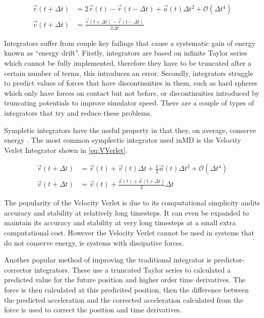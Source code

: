 \documentclass[12pt]{UoAthesis}
\begin{document}
\begin{subequations} \begin{align} \vec{r}(t + \Delta t) &= 2\vec{r}(t) -
\vec{r}(t - \Delta t) + \vec{a}(t)\Delta t^2 + \mathcal{O}(\Delta t^4)
\label{eq:Verletpos} \\ \vec{v}(t+\Delta t) &= \frac{\vec{r}(t+\Delta t) -
\vec{r}(t-\Delta t)}{2\Delta t} \label{eq:VerletVel} \end{align}
\end{subequations}

Integrators suffer from couple key failings that cause a systematic gain of
energy known as ``energy drift''. Firstly, integrators are based on infinite
Taylor series which cannot be fully implemented, therefore they have to be
truncated after a certain number of terms, this introduces an error. Secondly,
integrators struggle to predict values of forces that have discontinuities in
them, such as hard spheres which only have forces on contact but not before, or
discontinuities introduced by truncating potentials to improve simulator speed.
There are a couple of types of integrators that try and reduce these problems.

Sympletic integrators have the useful property in that they, on average,
conserve energy \cite{Hairer2003}. The most common symplectic integrator used
inMD is the Velocity Verlet Integrator \cite{Swope1982} shown in
\eqref{eq:VVerlet}.

\begin{subequations} \label{eq:VVerlet} \begin{align} \vec{r}(t + \Delta t) &=
\vec{r}(t) + \vec{v}(t) \Delta t + \frac{1}{2}\vec{a}(t) \Delta t^2 +
\mathcal{O}(\Delta t^4) \label{eq:VVerletpos} \\ \vec{v}(t+\Delta t) &=
\vec{v}(t) + \frac{\vec{a}(t)+\vec{a}(t+\Delta t)}{2}\Delta t
\label{eq:VVerletVel} \end{align} \end{subequations}

The popularity of the Velocity Verlet is due to its computational simplicity
andits accuracy and stability at relatively long timesteps. It can even be
expanded\cite{Khakimov2002} to maintain its accuracy and stability at very long
timesteps at a small extra computational cost. However the Velocity Verlet
cannot be used in systems that do not conserve energy, ie systems with
dissipative forces.

Another popular method of improving the traditional integrator is
predictor-corrector integrators. These use a truncated Taylor series to
calculated a predicted value for the future position and higher order time
derivatives. The force is then calculated at this predicited position, then the
difference between the predicted acceleration and the corrected acceleration
calculated from the force is used to correct the position and time derivatives.
\end{document}
